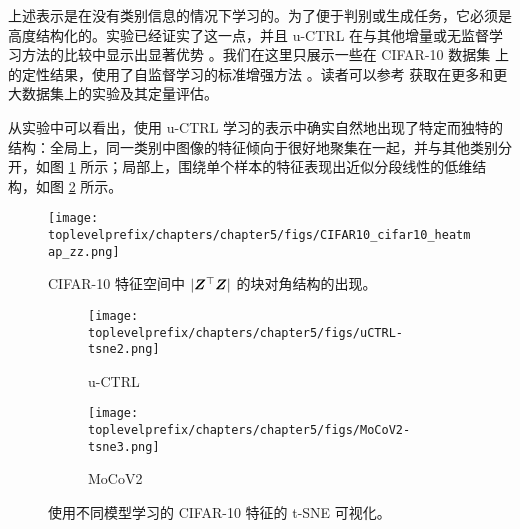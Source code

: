 \documentclass[../../book-main_zh.tex]{subfiles}
\begin{document}
上述表示是在没有类别信息的情况下学习的。为了便于判别或生成任务，它必须是高度结构化的。实验已经证实了这一点，并且 u-CTRL 在与其他增量或无监督学习方法的比较中显示出显著优势 \cite{pmlr-v234-tong24a}。我们在这里只展示一些在 CIFAR-10 数据集 \cite{krizhevsky2014cifar} 上的定性结果，使用了自监督学习的标准增强方法 \cite{chen2020simple}。读者可以参考 \cite{pmlr-v234-tong24a} 获取在更多和更大数据集上的实验及其定量评估。

从实验中可以看出，使用 u-CTRL 学习的表示中确实自然地出现了特定而独特的结构：全局上，同一类别中图像的特征倾向于很好地聚集在一起，并与其他类别分开，如图 \ref{fig:heatmap_z} 所示；局部上，围绕单个样本的特征表现出近似分段线性的低维结构，如图 \ref{fig:tsne} 所示。

\begin{figure}[t]
     \footnotesize
     \centering
    \texttt{[image: \\toplevelprefix/chapters/chapter5/figs/CIFAR10\_cifar10\_heatmap\_zz.png]}
    \caption{\small CIFAR-10 特征空间中 $|\bm{Z}^\top \bm{Z}|$ 的块对角结构的出现。}
    \label{fig:heatmap_z}
\end{figure}

\begin{figure}[h!]
    \begin{subfigure}[t]{0.46\textwidth}
        \centering
        \texttt{[image: \\toplevelprefix/chapters/chapter5/figs/uCTRL-tsne2.png]}
        \caption{u-CTRL}
    \end{subfigure}
    \hfill
    \begin{subfigure}[t]{0.46\textwidth}
        \centering
        \texttt{[image: \\toplevelprefix/chapters/chapter5/figs/MoCoV2-tsne3.png]}
        \caption{MoCoV2}
    \end{subfigure}
    \caption{\small 使用不同模型学习的 CIFAR-10 特征的 t-SNE 可视化。} 
    \label{fig:tsne}
\end{figure}
\end{document}

